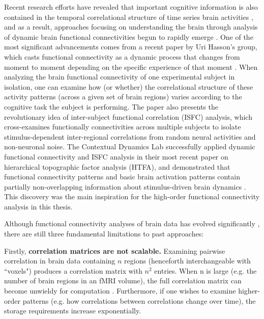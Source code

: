 \documentclass[11pt]{article}
\begin{document}
Recent research efforts have revealed that important cognitive information is also contained in the temporal correlational structure of time series brain activities \citep{davidson2016}, and as a result, approaches focusing on understanding the brain through analysis of dynamic brain functional connectivities begun to rapidly emerge \citep{Nigam2016}\citep{Hutchinson2013}. One of the most significant advancements comes from a recent paper by Uri Hasson's group, which casts functional connectivity as a dynamic process that changes from moment to moment depending on the specific experience of that moment \citep{hasson2016}. When analyzing the brain functional connectivity of one experimental subject in isolation, one can examine how (or whether) the correlational structure of these activity patterns (across a given set of brain regions) varies according to the cognitive task the subject is performing. The paper also presents the revolutionary idea of inter-subject functional correlation (ISFC) analysis, which cross-examines functionally connectivities across multiple subjects to isolate stimulus-dependent inter-regional correlations from random neural activities and non-neuronal noise. The Contextual Dynamics Lab successfully applied dynamic functional connectivity and ISFC analysis in their most recent paper on hierarchical topographic factor analysis (HTFA), and demonstrated that functional connectivity patterns and basic brain activation patterns contain partially non-overlapping information about stimulus-driven brain dynamics \citep{jeremy2017}. This discovery was the main inspiration for the high-order functional connectivity analysis in this thesis.

Although functional connectivity analyses of brain data has evolved significantly \citep{olaf2005}\citep{khambhati2017}, there are still three fundamental limitations to past approaches:

Firstly, \textbf{correlation matrices are not scalable.} Examining pairwise correlation in brain data containing $n$ regions (henceforth interchangeable with ``voxels") produces a correlation matrix with $n^2$ entries. When n is large (e.g. the number of brain regions in an fMRI volume), the full correlation matrix can become unwieldy for computation \citep{Rubinov2010}\citep{Betzel2017}\citep{Craddock2012}\citep{Yeo2011}. Furthermore, if one wishes to examine higher-order patterns (e.g. how correlations between correlations change over time), the storage requirements increase exponentially.
\end{document}
